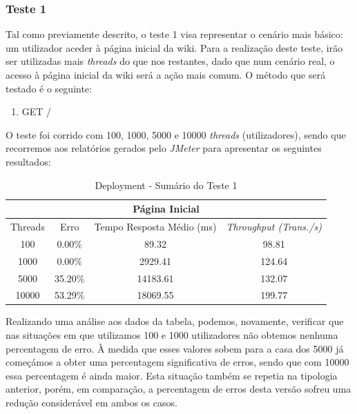 \subsubsection{Teste 1}


Tal como previamente descrito, o teste 1 visa representar o cenário mais básico: um utilizador aceder à página inicial da wiki. Para a realização deste teste, irão ser utilizadas mais \textit{threads} do que nos restantes, dado que num cenário real, o acesso à página inicial da wiki será a ação mais comum. O método que será testado é o seguinte:

\begin{enumerate}
  \item GET /
\end{enumerate}

O teste foi corrido com 100, 1000, 5000 e 10000 \textit{threads} (utilizadores), sendo que recorremos aos relatórios gerados pelo \textit{JMeter} para apresentar os seguintes resultados:

\begin{table}[h!]
\centering
    \begin{tabular}{ |c|c|c|c|  }
        \hline
        \multicolumn{4}{|c|}{Página Inicial} \\
        \hline
         Threads & Erro & Tempo Resposta Médio (ms) & \textit{Throughput (Trans./s)}\\
        \hline
        100   & 0.00\%   & 	89.32  & 98.81 \\
        1000  & 0.00\%   & 2929.41 & 124.64	\\
        5000  & 35.20\%  & 14183.61 & 132.07 \\
        10000 & 53.29\%  & 18069.55 & 199.77 \\
        \hline
    \end{tabular}
    \caption{Deployment - Sumário do Teste 1}
    \label{table:1}
\end{table}

Realizando uma análise aos dados da tabela, podemos, novamente, verificar que nas situações em que utilizamos 100 e 1000 utilizadores não obtemos nenhuma percentagem de erro. À medida que esses valores sobem para a casa dos 5000 já começámos a obter uma percentagem significativa de erros, sendo que com 10000 essa percentagem é ainda maior. Esta situação também se repetia na tipologia anterior, porém, em comparação, a percentagem de erros desta versão sofreu uma redução considerável em ambos os casos.

